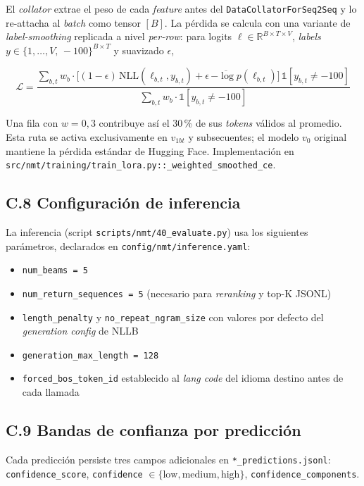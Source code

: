 \documentclass[12pt,a4paper,oneside]{book}
\newcommand{\filepath}[1]{\nolinkurl{#1}}
\begin{document}
El \emph{collator} extrae el peso de cada \emph{feature} antes del \texttt{DataCollatorForSeq2Seq} y lo re-attacha al \emph{batch} como tensor \([B]\). La pérdida se calcula con una variante de \emph{label-smoothing} replicada a nivel \emph{per-row}: para logits \(\ell \in \mathbb{R}^{B \times T \times V}\), \emph{labels} \(y \in \{1,\ldots,V,\, -100\}^{B \times T}\) y suavizado \(\epsilon\),

\[
\mathcal{L} = \frac{\sum_{b,t} w_b \cdot \big[(1-\epsilon)\, \text{NLL}(\ell_{b,t}, y_{b,t}) + \epsilon\, \overline{-\log p}(\ell_{b,t})\big]\, \mathbb{1}[y_{b,t} \neq -100]}{\sum_{b,t} w_b \cdot \mathbb{1}[y_{b,t} \neq -100]}
\]

Una fila con \(w=0{,}3\) contribuye así el 30\,\% de sus \emph{tokens} válidos al promedio. Esta ruta se activa exclusivamente en \(v_{1bt}\) y subsecuentes; el modelo \(v_0\) original mantiene la pérdida estándar de Hugging Face. Implementación en \filepath{src/nmt/training/train\_lora.py::\_weighted\_smoothed\_ce}.

\subsection*{C.8 Configuración de inferencia}\label{anexo-nmt-inferencia}

La inferencia (script \filepath{scripts/nmt/40\_evaluate.py}) usa los siguientes parámetros, declarados en \filepath{config/nmt/inference.yaml}:

\begin{itemize}
  \item \texttt{num\_beams = 5}
  \item \texttt{num\_return\_sequences = 5} (necesario para \emph{reranking} y top-K JSONL)
  \item \texttt{length\_penalty} y \texttt{no\_repeat\_ngram\_size} con valores por defecto del \emph{generation config} de NLLB
  \item \texttt{generation\_max\_length = 128}
  \item \texttt{forced\_bos\_token\_id} establecido al \emph{lang code} del idioma destino antes de cada llamada
\end{itemize}

\subsection*{C.9 Bandas de confianza por predicción}\label{anexo-nmt-confidence}

Cada predicción persiste tres campos adicionales en \filepath{*_predictions.jsonl}: \filepath{confidence_score}, \texttt{confidence} \(\in\{\text{low}, \text{medium}, \text{high}\}\), \filepath{confidence_components}.
\end{document}
